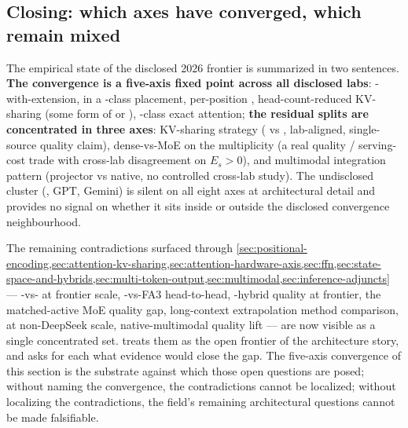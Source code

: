 \subsection{Closing: which axes have converged, which remain mixed}
\label{sec:snapshot-closing}

The empirical state of the disclosed 2026 frontier is summarized in
two sentences. \textbf{The convergence is a five-axis fixed point
across all disclosed labs}: -with-extension,  in a
-class placement,  per-position , head-count-reduced
KV-sharing (some form of  or ), -class exact
attention; \textbf{the residual splits are concentrated in three
axes}: KV-sharing strategy ( vs , lab-aligned, single-source
quality claim), dense-vs-MoE on the  multiplicity (a real
quality / serving-cost trade with cross-lab disagreement on
$E_s > 0$), and multimodal integration pattern (projector vs native,
no controlled cross-lab study). The undisclosed cluster (,
GPT, Gemini) is silent on all eight axes at architectural detail
and provides no signal on whether it sits inside or outside the
disclosed convergence neighbourhood.

The remaining contradictions surfaced through
\cref{sec:positional-encoding,sec:attention-kv-sharing,sec:attention-hardware-axis,sec:ffn,sec:state-space-and-hybrids,sec:multi-token-output,sec:multimodal,sec:inference-adjuncts}
--- -vs- at frontier scale, -vs-FA3 head-to-head,
-hybrid quality at frontier, the matched-active MoE quality gap,
long-context extrapolation method comparison,  at non-DeepSeek
scale, native-multimodal quality lift --- are now visible as a
single concentrated set.  treats them as
the open frontier of the architecture story, and asks for each what
evidence would close the gap. The five-axis convergence of this
section is the substrate against which those open questions are
posed; without naming the convergence, the contradictions cannot be
localized; without localizing the contradictions, the field's
remaining architectural questions cannot be made falsifiable.
